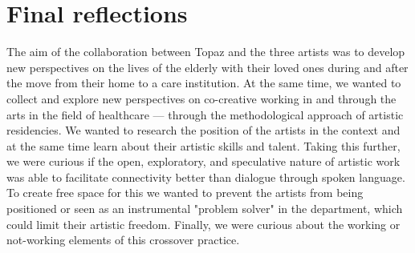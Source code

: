 \documentclass[authordate, empirical]{jote-new-article}
\begin{document}
	\section{Final reflections}
	\begin{originalPurpose}
		The aim of the collaboration between Topaz and the three artists was to develop new perspectives on the lives of the elderly with their loved ones during and after the move from their home to a care institution. At the same time, we wanted to collect and explore new perspectives on co-creative working in and through the arts in the field of healthcare — through the methodological approach of artistic residencies. We wanted to research the position of the artists in the context and at the same time learn about their artistic skills and talent. Taking this further, we were curious if the open, exploratory, and speculative nature of artistic work was able to facilitate connectivity better than dialogue through spoken language. To create free space for this we wanted to prevent the artists from being positioned or seen as an instrumental "problem solver" in the department, which could limit their artistic freedom. Finally, we were curious about the working or not-working elements of this crossover practice.
	\end{originalPurpose}
\end{document}
